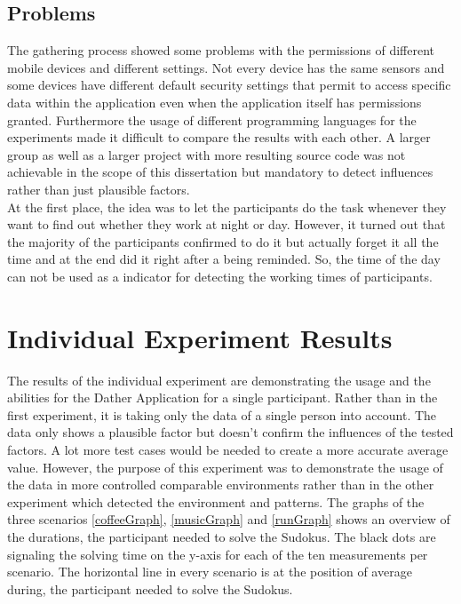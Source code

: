 \subsection{Problems}
The gathering process showed some problems with the permissions of different mobile devices and different settings. Not every device has the same sensors and some devices have different default security settings that permit to access specific data within the application even when the application itself has permissions granted. Furthermore the usage of different programming languages for the experiments made it difficult to compare the results with each other. 
A larger group as well as a larger project with more resulting source code was not achievable in the scope of this dissertation but mandatory to detect influences rather than just plausible factors.
\\
At the first place, the idea was to let the participants do the task whenever they want to find out whether they work at night or day. However, it turned out that the majority of the participants confirmed to do it but actually forget it all the time and at the end did it right after a being reminded. So, the time of the day can not be used as a indicator for detecting the working times of participants. 

\section{Individual Experiment Results}
The results of the individual experiment are demonstrating the usage and the abilities for the Dather Application for a single participant. Rather than in the first experiment, it is taking only the data of a single person into account.
The data only shows a plausible factor but doesn't confirm the influences of the tested factors. A lot more test cases would be needed to create a more accurate average value. However, the purpose of this experiment was to demonstrate the usage of the data in more controlled comparable environments rather than in the other experiment which detected the environment and patterns. 
\bigbreak
The graphs of the three scenarios \ref{coffeeGraph}, \ref{musicGraph} and \ref{runGraph} shows an overview of the durations, the participant needed to solve the Sudokus. The black dots are signaling the solving time on the y-axis for each of the ten measurements per scenario. The horizontal line in every scenario is at the position of average during, the participant needed to solve the Sudokus. 

